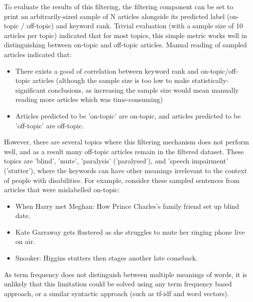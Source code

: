 \documentclass{report}
\begin{document}
To evaluate the results of this filtering, the filtering component can be set to print an arbitrarily-sized sample of N articles alongside its predicted label (on-topic / off-topic) and keyword rank.
Trivial evaluation (with a sample size of 10 articles per topic) indicated that for most topics, this simple metric works well in distinguishing between on-topic and off-topic articles.
Manual reading of sampled articles indicated that:
\begin{itemize}
	\item There exists a good of correlation between keyword rank and on-topic/off-topic articles (although the sample size is too low to make statistically-significant conclusions, as increasing the sample size would mean manually reading more articles which was time-consuming)
	\item Articles predicted to be 'on-topic' are on-topic, and articles predicted to be 'off-topic' are off-topic.
\end{itemize}

However, there are several topics where this filtering mechanism does not perform well, and as a result many off-topic articles remain in the filtered dataset.
These topics are 'blind', 'mute', 'paralysis' ('paralysed'), and 'speech impairment' ('stutter'), where the keywords can have other meanings irrelevant to the context of people with disabilities.
For example, consider these sampled sentences from articles that were mislabelled on-topic:
\begin{itemize}
	\item When Harry met Meghan: How Prince Charles's family friend set up blind date.
	\item Kate Garraway gets flustered as she struggles to mute her ringing phone live on air.
	\item Snooker: Higgins stutters then stages another late comeback.
\end{itemize}
As term frequency does not distinguish between multiple meanings of words, it is unlikely that this limitation could be solved using any term frequency based approach, or a similar syntactic approach (such as tf-idf and word vectors).
\end{document}
